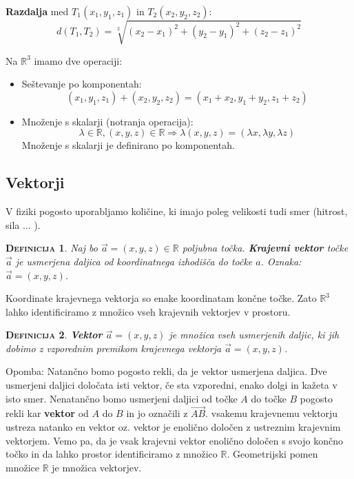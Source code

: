 \documentclass[a4paper,12pt]{article}
\newtheorem*{definicija}{\textsc{Definicija}}
\begin{document}
\textbf{Razdalja} med $T_1(x_1,y_1,z_1)$ in $T_2(x_2,y_2,z_2)$: $$d(T_1,T_2) = \sqrt[2]{(x_2 - x_1)^2 + (y_2 - y_1)^2 + (z_2 - z_1)^2}$$

Na $\mathbb{R}^3$ imamo dve operaciji:

\begin{itemize}
\item Seštevanje po komponentah: $$(x_1,y_1,z_1) + (x_2,y_2,z_2) = (x_1 + x_2, y_1 + y_2, z_1 + z_2)$$
\item Množenje s skalarji (notranja operacija): $$\lambda \in \mathbb{R} ,  (x,y,z) \in \mathbb{R} \Rightarrow \lambda (x,y,z) = (\lambda x, \lambda y, \lambda z)$$ 
Množenje s skalarji je definirano po komponentah.
\end{itemize}

\newpage

\begin{center}
\subsection{Vektorji}
\end{center}

V fiziki pogosto uporabljamo količine, ki imajo poleg velikosti tudi smer (hitrost, sila $\ldots$ ). \\

\begin{definicija}
Naj bo $\vec{a}=(x,y,z) \in \mathbb{R}$ poljubna točka. \textbf{Krajevni vektor} točke $\vec{a}$ je \linebreak usmerjena daljica od koordinatnega izhodišča do točke $a$. Oznaka: $\vec{a} = (x,y,z)$.\\
\end{definicija}

Koordinate krajevnega vektorja so enake koordinatam končne točke. Zato $\mathbb{R}^3$ lahko \linebreak identificiramo z množico vseh krajevnih vektorjev v prostoru. \\

\begin{definicija}
\textbf{Vektor} $\vec{a} = (x,y,z)$ je množica vseh usmerjenih daljic, ki jih dobimo z \linebreak  vzporednim premikom krajevnega vektorja $\vec{a} = (x,y,z)$.\\
\end{definicija}

Opomba: Natančno bomo pogosto rekli, da je vektor usmerjena daljica. Dve usmerjeni daljici določata isti vektor, če sta vzporedni, enako dolgi in kažeta v isto smer. \linebreak  Nenatančno bomo usmerjeni daljici od točke $A$ do točke $B$ pogosto rekli kar \textbf{vektor} od $A$ do $B$ in jo označili z $\overrightarrow{AB}$. vsakemu krajevnemu vektorju ustreza natanko en vektor oz. vektor je enolično določen z ustreznim krajevnim vektorjem. Vemo pa, da je vsak krajevni \linebreak  vektor enolično določen s svojo končno točko in da lahko prostor identificiramo z množico $\mathbb{R}$. \linebreak  Geometrijski pomen množice $\mathbb{R}$ je množica vektorjev. \\
\end{document}
